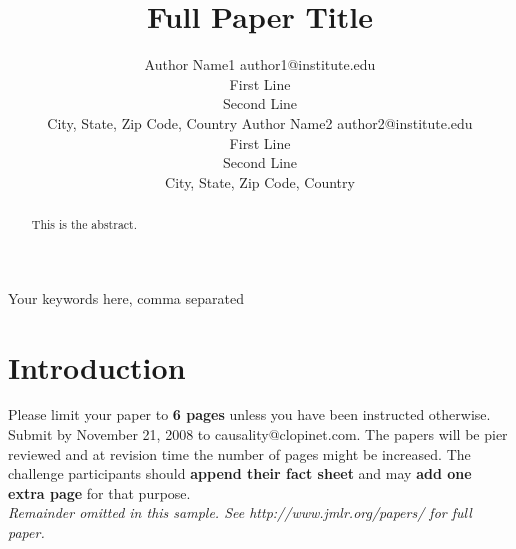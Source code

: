\documentclass[twoside,11pt]{article}
\begin{document}
\title{Full Paper Title}

\author{\name Author Name1 \email author1@institute.edu \\
       \addr First Line\\
       Second Line\\
       City, State, Zip Code, Country
       \AND
       \name Author Name2 \email author2@institute.edu \\
       \addr First Line\\
       Second Line\\
       City, State, Zip Code, Country}


\maketitle

\begin{abstract}%
This is the abstract.
\end{abstract}

\begin{keywords}
  Your keywords here, comma separated
\end{keywords}

\section{Introduction}
\label{sec:introduction}

Please limit your paper to {\bf 6 pages} unless you have been instructed otherwise. Submit by November 21, 2008 to causality@clopinet.com. The papers will be pier reviewed and at revision time the number of pages might be increased. The challenge participants should {\bf append their fact sheet} and may {\bf add one extra page} for that purpose. \\

{\noindent \em Remainder omitted in this sample. See http://www.jmlr.org/papers/ for full paper.}




\end{document}
